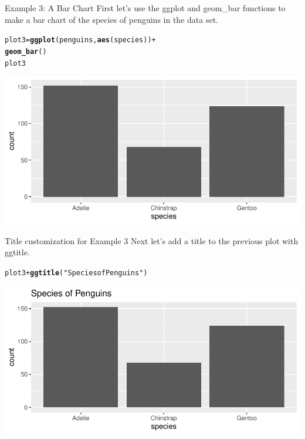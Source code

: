 \documentclass{beamer}\usepackage[]{graphicx}\usepackage[]{xcolor}
\makeatletter
\newcommand{\hlstr}[1]{\textcolor[rgb]{0.192,0.494,0.8}{#1}}%
\newcommand{\hlopt}[1]{\textcolor[rgb]{0,0,0}{#1}}%
\newcommand{\hlstd}[1]{\textcolor[rgb]{0.345,0.345,0.345}{#1}}%
\newcommand{\hlkwb}[1]{\textcolor[rgb]{0.69,0.353,0.396}{#1}}%
\newcommand{\hlkwd}[1]{\textcolor[rgb]{0.737,0.353,0.396}{\textbf{#1}}}%
\newenvironment{kframe}{%
 \def\at@end@of@kframe{}%
 \ifinner\ifhmode%
  \def\at@end@of@kframe{\end{minipage}}%
  \begin{minipage}{\columnwidth}%
 \fi\fi%
 \def\FrameCommand##1{\hskip\@totalleftmargin \hskip-\fboxsep
 \colorbox{shadecolor}{##1}\hskip-\fboxsep
     \hskip-\linewidth \hskip-\@totalleftmargin \hskip\columnwidth}%
 \MakeFramed {\advance\hsize-\width
   \@totalleftmargin\z@ \linewidth\hsize
   \@setminipage}}%
 {\par\unskip\endMakeFramed%
 \at@end@of@kframe}
\newenvironment{knitrout}{}{} %
\makeatother
\begin{document}
\begin{frame}[fragile]{Example 3: A Bar Chart}
First let's use the ggplot and geom\_bar functions to make a bar chart of the species of penguins in the data set.
\begin{knitrout}
\color{fgcolor}\begin{kframe}
\begin{alltt}
\hlstd{plot3} \hlkwb{=} \hlkwd{ggplot}\hlstd{(penguins,} \hlkwd{aes}\hlstd{(species))} \hlopt{+}
    \hlkwd{geom_bar}\hlstd{()}
\hlstd{plot3}
\end{alltt}
\end{kframe}
\includegraphics[width=0.95\linewidth]{figure/unnamed-chunk-11-1} 
\end{knitrout}

\end{frame}



\begin{frame}[fragile]{Title customization for Example 3}
Next let's add a title to the previous plot with ggtitle.
\begin{knitrout}
\color{fgcolor}\begin{kframe}
\begin{alltt}
\hlstd{plot3} \hlopt{+} \hlkwd{ggtitle}\hlstd{(}\hlstr{"Species of Penguins"}\hlstd{)}
\end{alltt}
\end{kframe}
\includegraphics[width=0.95\linewidth]{figure/unnamed-chunk-12-1} 
\end{knitrout}
\end{frame}
\end{document}

